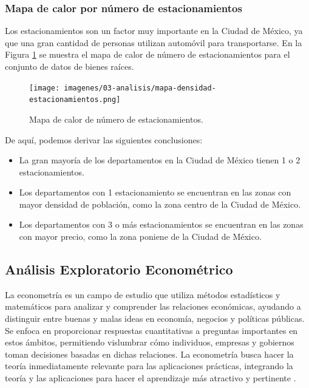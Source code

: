 \subsubsection{Mapa de calor por número de estacionamientos}

Los estacionamientos son un factor muy importante en la Ciudad de México, ya que
una gran cantidad de personas utilizan automóvil para transportarse. En la
Figura \ref{fig:mapa_calor_estacionamientos} se muestra el mapa de calor de
número de estacionamientos para el conjunto de datos de bienes raíces.

\begin{figure}[H]
  \centering
  \texttt{[image: imagenes/03-analisis/mapa-densidad-estacionamientos.png]}
  \caption{Mapa de calor de número de estacionamientos.}
  \label{fig:mapa_calor_estacionamientos}
\end{figure}

De aquí, podemos derivar las siguientes conclusiones:

\begin{itemize}
  \item La gran mayoría de los departamentos en la Ciudad de México tienen 1 o
  2 estacionamientos.
  \item Los departamentos con 1 estacionamiento se encuentran en las zonas con
  mayor densidad de población, como la zona centro de la Ciudad de México.
  \item Los departamentos con 3 o más estacionamientos se encuentran en las
  zonas con mayor precio, como la zona poniene de la Ciudad de México.
\end{itemize}


\subsection{Análisis Exploratorio Econométrico}

La econometría es un campo de estudio que utiliza métodos estadísticos y
matemáticos para analizar y comprender las relaciones económicas, ayudando a
distinguir entre buenas y malas ideas en economía, negocios y políticas
públicas. Se enfoca en proporcionar respuestas cuantitativas a preguntas
importantes en estos ámbitos, permitiendo vislumbrar cómo individuos, empresas
y gobiernos toman decisiones basadas en dichas relaciones. La econometría busca
hacer la teoría inmediatamente relevante para las aplicaciones prácticas,
integrando la teoría y las aplicaciones para hacer el aprendizaje más atractivo
y pertinente \cite{stock2012introduccion}.

